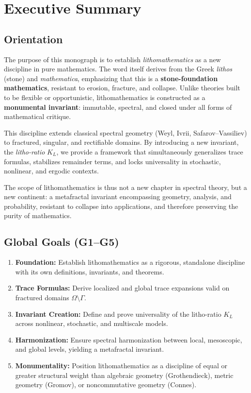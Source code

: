 
\chapter*{Executive Summary}
\label{chap:executive-summary}

\section*{Orientation}

The purpose of this monograph is to establish \emph{lithomathematics} as a new
discipline in pure mathematics. The word itself derives from the Greek
\emph{lithos} (stone) and \emph{mathematica}, emphasizing that this is a
\textbf{stone-foundation mathematics}, resistant to erosion, fracture, and
collapse. Unlike theories built to be flexible or opportunistic, lithomathematics
is constructed as a \textbf{monumental invariant}: immutable, spectral,
and closed under all forms of mathematical critique.

This discipline extends classical spectral geometry (Weyl, Ivrii, Safarov–Vassiliev)
to fractured, singular, and rectifiable domains. By introducing a new invariant,
the \emph{litho-ratio} $K_L$, we provide a framework that simultaneously
generalizes trace formulas, stabilizes remainder terms, and locks universality
in stochastic, nonlinear, and ergodic contexts.

The scope of lithomathematics is thus not a new chapter in spectral theory,
but a new continent: a metafractal invariant encompassing geometry, analysis,
and probability, resistant to collapse into applications, and therefore
preserving the purity of mathematics.

\section*{Global Goals (G1–G5)}

\begin{enumerate}[label=\textbf{G\arabic*}]
    \item \textbf{Foundation:} Establish lithomathematics as a rigorous,
    standalone discipline with its own definitions, invariants, and theorems.
    \item \textbf{Trace Formulas:} Derive localized and global trace expansions
    valid on fractured domains $\Omega\setminus\Gamma$.
    \item \textbf{Invariant Creation:} Define and prove universality of the
    litho-ratio $K_L$ across nonlinear, stochastic, and multiscale models.
    \item \textbf{Harmonization:} Ensure spectral harmonization between local,
    mesoscopic, and global levels, yielding a metafractal invariant.
    \item \textbf{Monumentality:} Position lithomathematics as a discipline of
    equal or greater structural weight than algebraic geometry (Grothendieck),
    metric geometry (Gromov), or noncommutative geometry (Connes).
\end{enumerate}

